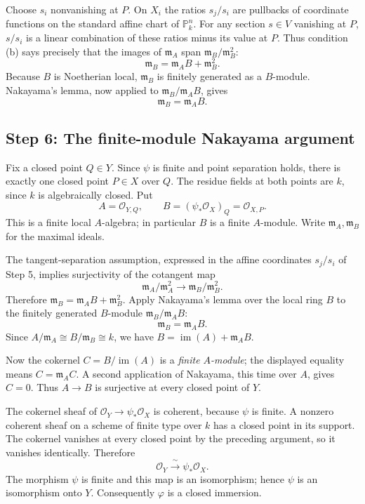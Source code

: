 Choose $s_i$ nonvanishing at $P$. On $X_i$ the ratios $s_j/s_i$
are pullbacks of coordinate functions on the standard affine chart
of $\mathbb P_k^n$. For any section $s\in V$ vanishing at $P$,
$s/s_i$ is a linear combination of these ratios minus its value
at $P$. Thus condition (b) says precisely that the images of
$\mathfrak m_A$ span $\mathfrak m_B/\mathfrak m_B^2$:
\[
\mathfrak m_B=\mathfrak m_A B+\mathfrak m_B^2.
\]
Because $B$ is Noetherian local, $\mathfrak m_B$ is finitely
generated as a $B$-module. Nakayama's lemma, now applied to
$\mathfrak m_B/\mathfrak m_A B$, gives
\[
\mathfrak m_B=\mathfrak m_A B.
\]

\subsection*{Step 6: The finite-module Nakayama argument}

Fix a closed point $Q\in Y$. Since $\psi$ is finite and point
separation holds, there is exactly one closed point $P\in X$ over $Q$.
The residue fields at both points are $k$, since $k$ is algebraically
closed. Put
\[
A=\mathcal O_{Y,Q},\qquad B=(\psi_*\mathcal O_X)_Q
=\mathcal O_{X,P}.
\]
This is a finite local $A$-algebra; in particular $B$ is a finite
$A$-module. Write $\mathfrak m_A,\mathfrak m_B$ for the maximal ideals.

The tangent-separation assumption, expressed in the affine coordinates
$s_j/s_i$ of Step 5, implies surjectivity of the cotangent map
\[
\mathfrak m_A/\mathfrak m_A^2\longrightarrow
\mathfrak m_B/\mathfrak m_B^2.
\]
Therefore $\mathfrak m_B=\mathfrak m_A B+\mathfrak m_B^2$.
Apply Nakayama's lemma over the local ring $B$ to the finitely
generated $B$-module $\mathfrak m_B/\mathfrak m_A B$:
\[
\mathfrak m_B=\mathfrak m_A B.
\]
Since $A/\mathfrak m_A\cong B/\mathfrak m_B\cong k$, we have
$B=\operatorname{im}(A)+\mathfrak m_A B$.

Now the cokernel $C=B/\operatorname{im}(A)$ is a \emph{finite $A$-module};
the displayed equality means $C=\mathfrak m_A C$. A second application
of Nakayama, this time over $A$, gives $C=0$. Thus $A\to B$ is
surjective at every closed point of $Y$.

The cokernel sheaf of $\mathcal O_Y\to\psi_*\mathcal O_X$ is coherent,
because $\psi$ is finite. A nonzero coherent sheaf on a scheme of
finite type over $k$ has a closed point in its support. The cokernel
vanishes at every closed point by the preceding argument, so it
vanishes identically. Therefore
\[
\mathcal O_Y\xrightarrow{\ \sim\ }\psi_*\mathcal O_X.
\]
The morphism $\psi$ is finite and this map is an isomorphism; hence
$\psi$ is an isomorphism onto $Y$. Consequently $\varphi$ is a
closed immersion.

